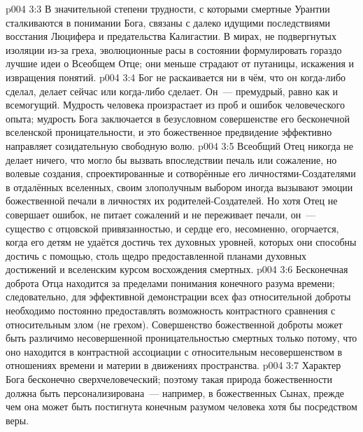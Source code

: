 \vs p004 3:3 \pc В значительной степени трудности, с которыми смертные Урантии сталкиваются в понимании Бога, связаны с далеко идущими последствиями восстания Люцифера и предательства Калигастии. В мирах, не подвергнутых изоляции из\hyp{}за греха, эволюционные расы в состоянии формулировать гораздо лучшие идеи о Всеобщем Отце; они меньше страдают от путаницы, искажения и извращения понятий.
\vs p004 3:4 \pc Бог не раскаивается ни в чём, что он когда\hyp{}либо сделал, делает сейчас или когда\hyp{}либо сделает. Он~--- премудрый, равно как и всемогущий. Мудрость человека произрастает из проб и ошибок человеческого опыта; мудрость Бога заключается в безусловном совершенстве его бесконечной вселенской проницательности, и это божественное предвидение эффективно направляет созидательную свободную волю.
\vs p004 3:5 Всеобщий Отец никогда не делает ничего, что могло бы вызвать впоследствии печаль или сожаление, но волевые создания, спроектированные и сотворённые его личностями\hyp{}Создателями в отдалённых вселенных, своим злополучным выбором иногда вызывают эмоции божественной печали в личностях их родителей\hyp{}Создателей. Но хотя Отец не совершает ошибок, не питает сожалений и не переживает печали, он~--- существо с отцовской привязанностью, и сердце его, несомненно, огорчается, когда его детям не удаётся достичь тех духовных уровней, которых они способны достичь с помощью, столь щедро предоставленной планами духовных достижений и вселенским курсом восхождения смертных.
\vs p004 3:6 Бесконечная доброта Отца находится за пределами понимания конечного разума времени; следовательно, для эффективной демонстрации всех фаз относительной доброты необходимо постоянно предоставлять возможность контрастного сравнения с относительным злом (не грехом). Совершенство божественной доброты может быть различимо несовершенной проницательностью смертных только потому, что оно находится в контрастной ассоциации с относительным несовершенством в отношениях времени и материи в движениях пространства.
\vs p004 3:7 Характер Бога бесконечно сверхчеловеческий; поэтому такая природа божественности должна быть персонализирована~--- например, в божественных Сынах, прежде чем она может быть постигнута конечным разумом человека хотя бы посредством веры.
